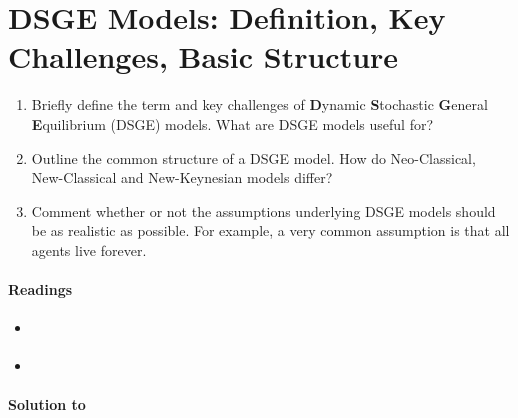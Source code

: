 \section[DSGE Models: Definition, Key Challenges, Basic Structure]{DSGE Models: Definition, Key Challenges, Basic Structure\label{ex:DSGEModelsDefinitionChallengesStructure}}
\begin{enumerate}
\item Briefly define the term and key challenges of \textbf{D}ynamic \textbf{S}tochastic \textbf{G}eneral \textbf{E}quilibrium (DSGE) models.
What are DSGE models useful for?
\item Outline the common structure of a DSGE model.
How do Neo-Classical, New-Classical and New-Keynesian models differ?
\item Comment whether or not the assumptions underlying DSGE models should be as realistic as possible.
For example, a very common assumption is that all agents live forever.
\end{enumerate}

\paragraph{Readings}
\begin{itemize}
\item \textcite[Ch.~1]{Fernandez-Villaverde.Rubio-Ramirez.Schorfheide_2016_SolutionEstimationMethods}
\item \textcite[Ch.~1]{Torres_2013_IntroductionDynamicMacroeconomic}
\end{itemize}

\begin{solution}\textbf{Solution to }
\ifDisplaySolutions%

\fi
\newpage
\end{solution}
